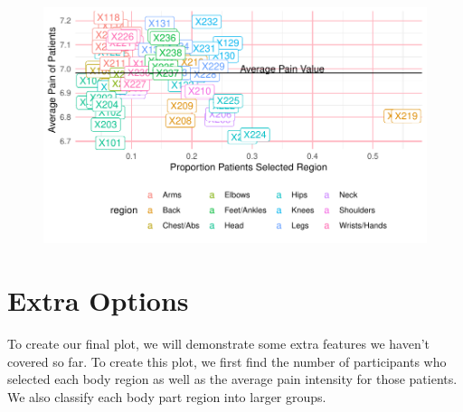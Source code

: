 \documentclass[
  letterpaper,
]{krantz}
\begin{document}
\begin{figure}[H]

{\centering \includegraphics[width=1\textwidth,height=\textheight]{book/7_visualization_ggplot_files/figure-pdf/unnamed-chunk-20-1.pdf}

}

\end{figure}

\hypertarget{extra-options}{%
\section{Extra Options}\label{extra-options}}

To create our final plot, we will demonstrate some extra features we
haven't covered so far. To create this plot, we first find the number of
participants who selected each body region as well as the average pain
intensity for those patients. We also classify each body part region
into larger groups.
\end{document}
